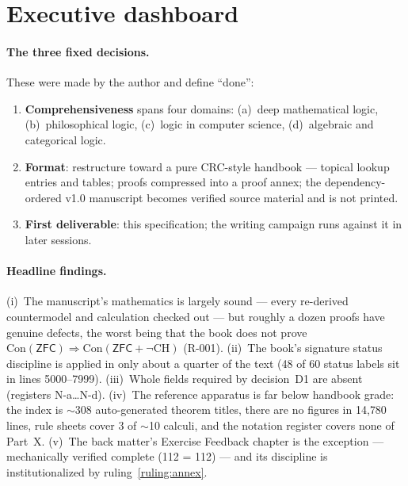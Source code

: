 \documentclass[11pt,letterpaper]{article}
\begin{document}
\section{Executive dashboard}
\label{sec:dashboard}

\paragraph{The three fixed decisions.}
These were made by the author and define ``done'':
\begin{enumerate}[label=\textbf{D\arabic*.}]
  \item \textbf{Comprehensiveness} spans four domains: (a)~deep
        mathematical logic, (b)~philosophical logic, (c)~logic in
        computer science, (d)~algebraic and categorical logic.
  \item \textbf{Format}: restructure toward a pure CRC-style handbook ---
        topical lookup entries and tables; proofs compressed into a
        proof annex; the dependency-ordered v1.0 manuscript becomes
        verified source material and is not printed.
  \item \textbf{First deliverable}: this specification; the writing
        campaign runs against it in later sessions.
\end{enumerate}

\paragraph{Headline findings.}
(i)~The manuscript's mathematics is largely sound --- every re-derived
countermodel and calculation checked out --- but roughly a dozen proofs
have genuine defects, the worst being that the book does not prove
$\mathrm{Con}(\mathsf{ZFC})\Rightarrow\mathrm{Con}(\mathsf{ZFC}+\neg\mathrm{CH})$
(R-001).
(ii)~The book's signature status discipline is applied in only about a
quarter of the text (48 of 60 status labels sit in lines 5000--7999).
(iii)~Whole fields required by decision~D1 are absent (registers
N-a\ldots N-d).
(iv)~The reference apparatus is far below handbook grade: the index is
$\sim$308 auto-generated theorem titles, there are no figures in 14{,}780
lines, rule sheets cover 3 of $\sim$10 calculi, and the notation
register covers none of Part~X.
(v)~The back matter's Exercise Feedback chapter is the exception ---
mechanically verified complete (112 = 112) --- and its discipline is
institutionalized by ruling~\ref{ruling:annex}.

\medskip

\end{document}
